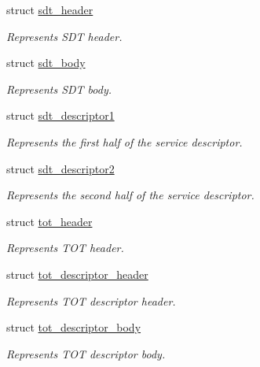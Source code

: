 \begin{DoxyCompactItemize}
struct \hyperlink{structsdt__header}{sdt\+\_\+header}
\begin{DoxyCompactList}\small\item\em Represents S\+DT header. \end{DoxyCompactList}\item 
struct \hyperlink{structsdt__body}{sdt\+\_\+body}
\begin{DoxyCompactList}\small\item\em Represents S\+DT body. \end{DoxyCompactList}\item 
struct \hyperlink{structsdt__descriptor1}{sdt\+\_\+descriptor1}
\begin{DoxyCompactList}\small\item\em Represents the first half of the service descriptor. \end{DoxyCompactList}\item 
struct \hyperlink{structsdt__descriptor2}{sdt\+\_\+descriptor2}
\begin{DoxyCompactList}\small\item\em Represents the second half of the service descriptor. \end{DoxyCompactList}\item 
struct \hyperlink{structtot__header}{tot\+\_\+header}
\begin{DoxyCompactList}\small\item\em Represents T\+OT header. \end{DoxyCompactList}\item 
struct \hyperlink{structtot__descriptor__header}{tot\+\_\+descriptor\+\_\+header}
\begin{DoxyCompactList}\small\item\em Represents T\+OT descriptor header. \end{DoxyCompactList}\item 
struct \hyperlink{structtot__descriptor__body}{tot\+\_\+descriptor\+\_\+body}
\begin{DoxyCompactList}\small\item\em Represents T\+OT descriptor body. \end{DoxyCompactList}\end{DoxyCompactItemize}
